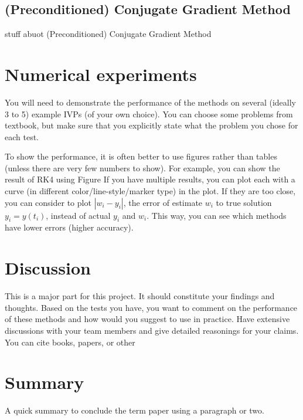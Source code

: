 \documentclass[11pt]{article}	%
\begin{document}
\subsection{(Preconditioned) Conjugate Gradient Method}
stuff abuot (Preconditioned) Conjugate Gradient Method

\section{Numerical experiments}
You will need to demonstrate the performance
of the methods on several (ideally 3 to 5) example IVPs (of your own choice).
You can choose some problems from textbook, but make sure that you
explicitly state what the problem you chose for each test.

To show the performance, it is often better to use figures
rather than tables (unless there are very few numbers to show).
For example, you can show the result of RK4
using Figure If you have multiple results, you can plot each
with a curve (in different color/line-style/marker type) in the plot. If they are too close, you can consider to
plot $|w_i-y_i|$, the error of estimate $w_i$ to true solution $y_i=y(t_i)$,
instead of actual $y_i$ and $w_i$. This way, you can see which methods have lower errors (higher accuracy).

\section{Discussion}
This is a major part for this project. It should constitute your findings and thoughts.
Based on the tests you have,
you want to comment on the performance of these methods and how would you
suggest to use in practice. Have extensive discussions with your team members
and give detailed reasonings for your claims. You can cite books, papers, or other


\section{Summary}
A quick summary to conclude the term paper using a paragraph or two.
\end{document}
